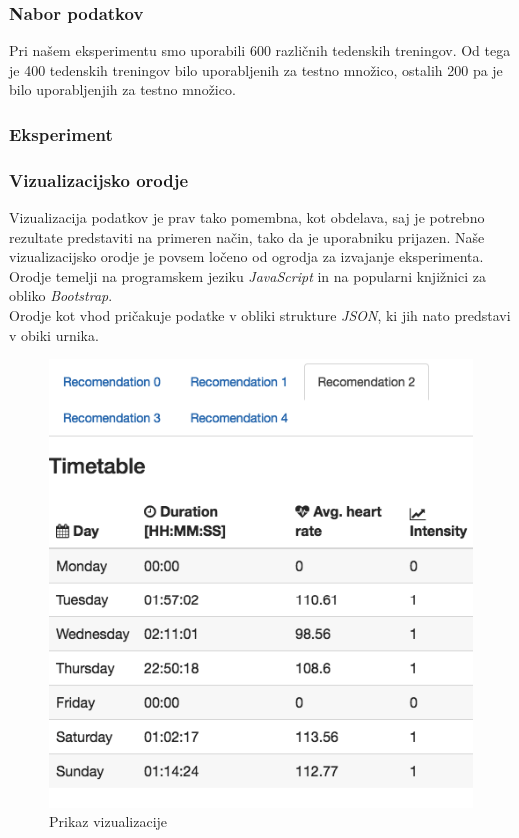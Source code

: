 \documentclass{acm_proc_article-sp}
\begin{document}
\subsubsection{Nabor podatkov}
Pri našem eksperimentu smo uporabili 600 različnih tedenskih treningov.
Od tega je 400 tedenskih treningov bilo uporabljenih za testno množico, ostalih 200 pa je bilo uporabljenjih za testno množico.

\subsubsection{Eksperiment}

\subsubsection{Vizualizacijsko orodje}
Vizualizacija podatkov je prav tako pomembna, kot obdelava, saj je potrebno rezultate predstaviti na primeren način, tako da je uporabniku prijazen. Naše vizualizacijsko orodje je povsem ločeno od ogrodja za izvajanje eksperimenta. Orodje temelji na programskem jeziku \textit{JavaScript} in na popularni knjižnici za obliko \textit{Bootstrap}.\\
Orodje kot vhod pričakuje podatke v obliki strukture \textit{JSON}, ki jih nato predstavi v obiki urnika.\\ 


\begin{figure}
 \centering
 \includegraphics[width=\linewidth]{vizualization}
 \caption{Prikaz vizualizacije}
\end{figure}
\end{document}
